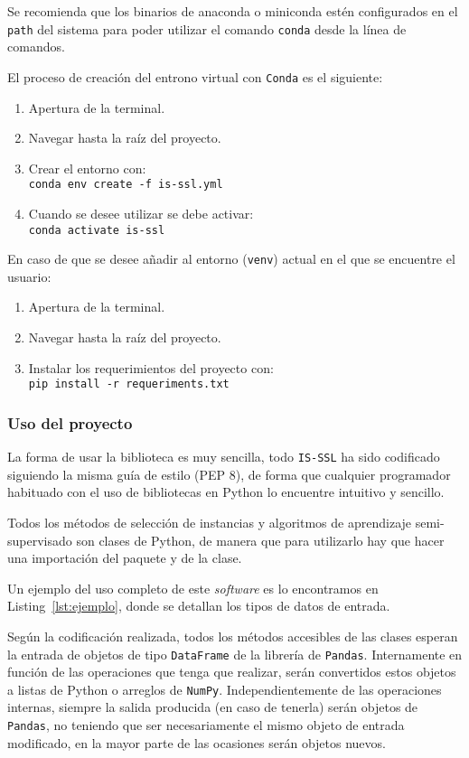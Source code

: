 Se recomienda que los binarios de anaconda o miniconda estén configurados en el \texttt{path} del sistema para poder utilizar el comando \texttt{conda} desde la línea de comandos.

El proceso de creación del entrono virtual con \texttt{Conda} es el siguiente:
\begin{enumerate}
\tightlist
\item Apertura de la terminal.
\item Navegar hasta la raíz del proyecto.
\item Crear el entorno con:\\
\texttt{conda env create -f is-ssl.yml}
\item Cuando se desee utilizar se debe activar:\\
\texttt{conda activate is-ssl}
\end{enumerate}

En caso de que se desee añadir al entorno (\texttt{venv}) actual en el que se encuentre el usuario:
\begin{enumerate}
\tightlist
\item Apertura de la terminal.
\item Navegar hasta la raíz del proyecto.
\item Instalar los requerimientos del proyecto con:\\
\texttt{pip install -r requeriments.txt}
\end{enumerate}

\subsubsection{Uso del proyecto}
La forma de usar la biblioteca es muy sencilla, todo \texttt{IS-SSL} ha sido codificado siguiendo la misma guía de estilo (PEP 8), de forma que cualquier programador habituado con el uso de bibliotecas en Python lo encuentre intuitivo y sencillo.

Todos los métodos de selección de instancias y algoritmos de aprendizaje semi-supervisado son clases de Python, de manera que para utilizarlo hay que hacer una importación del paquete y de la clase.

Un ejemplo del uso completo de este \textit{software} es lo encontramos en Listing~\ref{lst:ejemplo}, donde se detallan los tipos de datos de entrada.

Según la codificación realizada, todos los métodos accesibles de las clases esperan la entrada de objetos de tipo \texttt{DataFrame} de la librería de \texttt{Pandas}. Internamente en función de las operaciones que tenga que realizar, serán convertidos estos objetos a listas de Python o arreglos de \texttt{NumPy}. Independientemente de las operaciones internas, siempre la salida producida (en caso de tenerla) serán objetos de \texttt{Pandas}, no teniendo que ser necesariamente el mismo objeto de entrada modificado, en la mayor parte de las ocasiones serán objetos nuevos.

